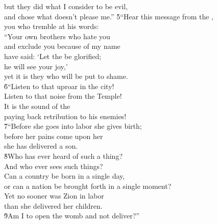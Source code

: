 \begin{poetry}
\poeml but they did what I consider to be evil, \\
\poemll    and chose what doesn't please me.''
\poeml \v{5}``Hear this message from the , \\
\poemll    you who tremble at his words: \\
\poeml ``Your own brothers who hate you \\
\poemll    and exclude you because of my name \\
\poeml have said: `Let the  be glorified; \\
\poemll    he will see your joy,' \\
\poemlll       yet it is they who will be put to shame. \\
\poeml \v{6}``Listen to that uproar in the city! \\
\poemll    Listen to that noise from the Temple! \\
\poeml It is the sound of the  \\
\poemll    paying back retribution to his enemies! \\
\poeml \v{7}``Before she goes into labor she gives birth; \\
\poemll    before her pains come upon her \\
\poemlll       she has delivered a son. \\
\poeml \v{8}Who has ever heard of such a thing? \\
\poemll    And who ever sees such things? \\
\poeml Can a country be born in a single day, \\
\poemll    or can a nation be brought forth in a single moment? \\
\poeml Yet no sooner was Zion in labor \\
\poemll    than she delivered her children. \\
\poeml \v{9}Am I to open the womb and not deliver?'' \\

\end{poetry}
